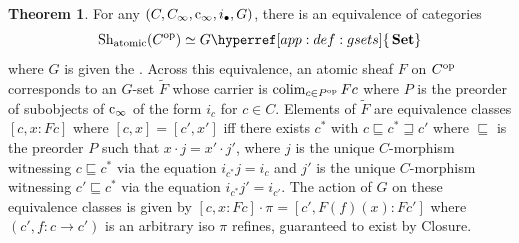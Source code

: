 \documentclass[
  sigconf,
  screen, ]{acmart}
\theoremstyle{definition}
\newtheorem{theorem}{Theorem}[section]
\newcommand\colim{\operatorname{colim}}
\newcommand\nref[2]{\hyperref[#1]{#2}} \newcommand\checkhigh{{\huge{\color{red}\textbf{TODO: check}}}}
\newcommand\Shjat{\operatorname{Sh}_{{\rm atomic}}}
\newcommand\tgsets[1]{{#1{\nref{app:def:gsets}{\,\Set}}}}
\newcommand\op{^{\rm op}}
\newcommand\Set{\mathbf{Set}}
\newcommand\cinfty{{{\rm c}_\infty}}
\begin{document}
\begin{theorem} \label{app:thm:nominal-situation}
  For any  $(C,C_\infty,\cinfty,i_\bullet,G)$,
  there is an equivalence of categories
  \[
    \Shjat(C^{\rm op})
    \simeq
    \tgsets{G}
   \]
   where $G$ is given the .
   Across this equivalence,
   an atomic sheaf $F$ on $C\op$
   corresponds to an $G$-set $\tilde F$
   whose carrier is
   $\colim_{c\in P\op} Fc$ where $P$ is the
   preorder of subobjects of $\cinfty$ of the form $i_c$ for $c\in C$.
   Elements of $\tilde F$
   are equivalence classes $[c,x:Fc]$
   where $[c,x] = [c',x']$
   iff there exists $c^*$ with $c\sqsubseteq c^*\sqsupseteq c'$
   where $\sqsubseteq$ is the preorder $P$
   such that $x\cdot j = x'\cdot j'$,
   where $j$ is the unique $C$-morphism witnessing $c\sqsubseteq c^*$
   via the equation $i_{c^*} j = i_c$
   and $j'$ is the unique $C$-morphism witnessing $c'\sqsubseteq c^*$
   via the equation $i_{c^*} j' = i_{c'}$.
   The action of $G$
   on these equivalence classes
   is given by $[c, x:Fc]\cdot \pi = [c', F(f)(x):Fc']$
   where $(c',f:c\to c')$ is an arbitrary iso
   $\pi$ refines, guaranteed to exist by Closure.
\end{theorem}
\end{document}
